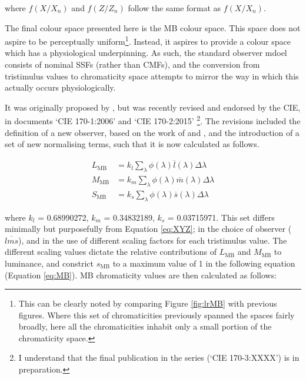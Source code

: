 where $f(X/X_{n})$ and $f(Z/Z_{n})$ follow the same format as $f(X/X_{n})$.

The final colour space presented here is the \acrfull{MB} colour space. This space does not aspire to be perceptually uniform\footnote{This can be clearly noted by comparing Figure \ref{fig:lrMB} with previous figures. Where this set of chromaticities previously spanned the spaces fairly broadly, here all the chromaticities inhabit only a small portion of the chromaticity space.}. Instead, it aspires to provide a colour space which has a physiological underpinning. As such, the standard observer mdoel consists of nominal \glspl{SSF} (rather than \glspl{CMF}), and the conversion from tristimulus values to chromaticity space attempts to mirror the way in which this actually occurs physiologically.

It was originally proposed by \citet{macleod_chromaticity_1979}, but was recently revised and endorsed by the \gls{CIE}, in documents `CIE 170-1:2006' \citep{cie_cie_2006} and `CIE 170-2:2015' \citep{cie_cie_2015}\footnote{I understand that the final publication in the series (`CIE 170-3:XXXX') is in preparation.}. The revisions included the definition of a new observer, based on the work of \citet{stockman_spectral_1999} and \citet{stockman_spectral_2000}, and the introduction of a set of new normalising terms, such that it is now calculated as follows.

\begin{subequations}
\begin{align}
L_{\text{MB}}&=k_{l} \sum_{\lambda} \phi(\lambda) \overline{l}(\lambda) \Delta \lambda \\ 
M_{\text{MB}}&=k_{m} \sum_{\lambda} \phi(\lambda) \overline{m}(\lambda) \Delta \lambda \\ 
S_{\text{MB}}&=k_{s} \sum_{\lambda} \phi(\lambda) \overline{s}(\lambda) \Delta \lambda
\end{align}
\label{eq:MBTristim}
\end{subequations}

where $k_{l}$ = 0.68990272, $k_{m}$ = 0.34832189, $k_{s}$ = 0.03715971. This set differs minimally but purposefully from Equation \ref{eq:XYZ}; in the choice of observer ($\overline{lms}$), and in the use of different scaling factors for each tristimulus value. The different scaling values dictate the relative contributions of $L_{\text{MB}}$ and $M_{\text{MB}}$ to luminance, and constrict $s_{\text{MB}}$ to a maximum value of 1 in the following equation (Equation \ref{eq:MB}). \gls{MB} chromaticity values are then calculated as follows:

